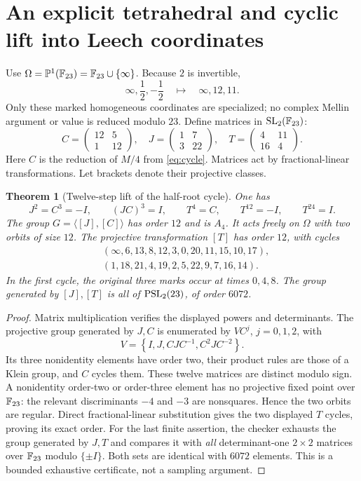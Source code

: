 \documentclass[11pt,reqno]{amsart}
\newtheorem{theorem}{Theorem}[section]
\theoremstyle{definition}\newtheorem{definition}[theorem]{Definition}
\theoremstyle{remark}\newtheorem{remark}[theorem]{Remark}
\begin{document}
\section{An explicit tetrahedral and cyclic lift into Leech coordinates}
Use $\Omega=\mathbb P^1(\mathbb F_{23})=\mathbb F_{23}\cup\{\infty\}$. Because $2$ is invertible,
\[
\infty,\frac12,-\frac12\quad\longmapsto\quad\infty,12,11.
\]
Only these marked homogeneous coordinates are specialized; no complex Mellin argument or value is reduced modulo $23$.
Define matrices in $\operatorname{SL}_2(\mathbb F_{23})$:
\begin{equation}\label{eq:matrices}
C=\begin{pmatrix}12&5\\1&12\end{pmatrix},\quad
J=\begin{pmatrix}1&7\\3&22\end{pmatrix},\quad
T=\begin{pmatrix}4&11\\16&4\end{pmatrix}.
\end{equation}
Here $C$ is the reduction of $M/4$ from \eqref{eq:cycle}. Matrices act by fractional-linear transformations. Let brackets denote their projective classes.

\begin{theorem}[Twelve-step lift of the half-root cycle]\label{thm:groups}
One has
\[
J^2=C^3=-I,\qquad (JC)^3=I,\qquad T^4=C,\qquad T^{12}=-I,\qquad T^{24}=I.
\]
The group $G=\langle[J],[C]\rangle$ has order $12$ and is $A_4$. It acts freely on $\Omega$ with two orbits of size $12$. The projective transformation $[T]$ has order $12$, with cycles
\begin{align*}
&(\infty,6,13,8,12,3,0,20,11,15,10,17),\\
&(1,18,21,4,19,2,5,22,9,7,16,14).
\end{align*}
In the first cycle, the original three marks occur at times $0,4,8$. The group generated by $[J],[T]$ is all of $\operatorname{PSL}_2(23)$, of order $6072$.
\end{theorem}
\begin{proof}
Matrix multiplication verifies the displayed powers and determinants. The projective group generated by $J,C$ is enumerated by $V C^j$, $j=0,1,2$, with
\[
V=\left\{I,J,CJC^{-1},C^2JC^{-2}\right\}.
\]
Its three nonidentity elements have order two, their product rules are those of a Klein group, and $C$ cycles them. These twelve matrices are distinct modulo sign. A nonidentity order-two or order-three element has no projective fixed point over $\mathbb F_{23}$: the relevant discriminants $-4$ and $-3$ are nonsquares. Hence the two orbits are regular. Direct fractional-linear substitution gives the two displayed $T$ cycles, proving its exact order. For the last finite assertion, the checker exhausts the group generated by $J,T$ and compares it with \emph{all} determinant-one $2\times2$ matrices over $\mathbb F_{23}$ modulo $\{\pm I\}$. Both sets are identical with $6072$ elements. This is a bounded exhaustive certificate, not a sampling argument.
\end{proof}
\end{document}
